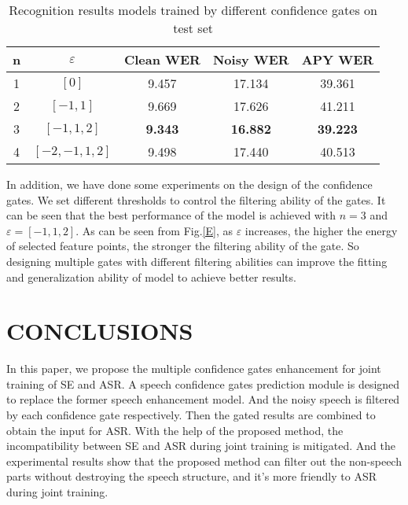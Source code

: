 \documentclass{article}
\begin{document}
	
	\begin{table}[htp]
		\setlength\tabcolsep{4pt}
		\centering
		\vspace{-0.4cm}
		\caption{Recognition results models trained by different confidence gates on test set}
		\begin{tabular}{ccccc}
			\toprule
			n & $\varepsilon$ & Clean WER & Noisy WER & APY WER  \\
			\midrule
			1 & $\left[0\right]$  & 9.457 & 17.134 & 39.361 \\	
			2 & $\left[-1,1\right]$  & 9.669 & 17.626 & 41.211   \\
			3  & $\left[-1,1,2\right]$ & \textbf{9.343} & \textbf{16.882} & \textbf{39.223}   \\
			4  & $\left[-2,-1,1,2\right]$ & 9.498 & 17.440 & 40.513 \\
			\bottomrule
		\end{tabular}
		\label{tab:3}
		\vspace{-0.1cm}
	\end{table}

	In addition, we have done some experiments on the design of the confidence gates. We set different thresholds to control the filtering ability of the gates. It can be seen that the best performance of the model is achieved with $n=3$ and $\varepsilon=\left[-1,1,2\right]$. As can be seen from Fig.\ref{E}, as $\varepsilon$ increases, the higher the energy of selected feature points, the stronger the filtering ability of the gate. So designing multiple gates with different filtering abilities can improve the fitting and generalization ability of model to achieve better results.
	
		
	\section{CONCLUSIONS}
	In this paper, we propose the multiple confidence gates enhancement for joint training of SE and ASR. A speech confidence gates prediction module is designed to replace the former speech enhancement model. And the noisy speech is filtered by each confidence gate respectively. Then the gated results are combined to obtain the input for ASR. With the help of the proposed method, the incompatibility between SE and ASR during joint training is mitigated. And the experimental results show that the proposed method can filter out the non-speech parts without destroying the speech structure, and it's more friendly to ASR during joint training.
	
	
	
\end{document}
